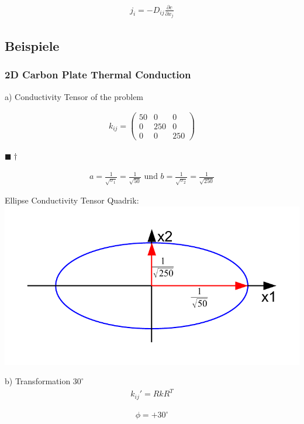 \documentclass[a4paper]{scrartcl}
\newcommand{\qed}{\begin{flushright}
$\blacksquare \dagger$ \end{flushright}}
\begin{document}
\begin{align}
j_i=-D_{ij}\frac{\partial c}{\partial x_j}
\end{align}

\subsection{Beispiele}
\subsubsection{2D Carbon Plate Thermal Conduction}

a) Conductivity Tensor of the problem

\begin{align}
k_{ij}=\begin{pmatrix}
50 & 0 & 0 \\
0 & 250 & 0 \\
0 & 0 & 250 
\end{pmatrix}
\end{align}
\qed
\begin{align}
a = \frac{1}{\sqrt{\sigma_1}} = \frac{1}{\sqrt{50}} \text{ und } b =
\frac{1}{\sqrt{\sigma_2}} = \frac{1}{\sqrt{250}}
\end{align}

\begin{center}
Ellipse Conductivity Tensor Quadrik:\\
\includegraphics[scale=0.8]{images/quadrik_2d_ellipse_uebung.pdf}
\end{center}


b) Transformation $30^\circ$
\begin{align}
k_{ij}'=RkR^{T}
\end{align}

\begin{align}
\phi=+30^\circ
\end{align}
\end{document}
